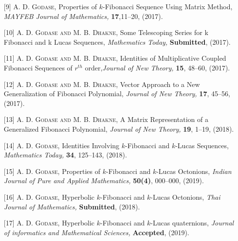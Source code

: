 \begin{footnotesize}
\begin{itemize}
\item[{[9]}]\textsc{A. D. Godase}, Properties of $k$-Fibonacci Sequence Using Matrix Method, {\it MAYFEB Journal of Mathematics,} {\bf 17},11--20, (2017).

\item[{[10]}] \textsc{A. D. Godase and M. B. Dhakne,} Some Telescoping Series for k Fibonacci and k Lucas Sequences, {\it Mathematics Today,} {\bf Submitted}, (2017).

\item[{[11]}] \textsc{A. D. Godase and M. B. Dhakne,} {Identities of Multiplicative Coupled Fibonacci Sequences of $r^{th}$ order,}{\it Journal of New Theory,} {\bf 15}, 48--60, (2017).

\item[{[12]}]\textsc{A. D. Godase and M. B. Dhakne}, Vector Approach to a New Generalization of Fibonacci Polynomial,  {\it Journal of New Theory,} {\bf 17}, 45--56,(2017).

\item[{[13]}] \textsc{A. D. Godase and M. B. Dhakne,} A Matrix Representation of a Generalized Fibonacci Polynomial, {\it Journal of New Theory,} {\bf 19}, 1--19, (2018).
 
 \item[{[14]}] \textsc{A. D. Godase,} Identities Involving $k$-Fibonacci and $k$-Lucas Sequences, {\it Mathematics Today,} {\bf 34}, 125--143, (2018). 
 
 \item[{[15]}] \textsc{A. D. Godase,} Properties of $k$-Fibonacci and $k$-Lucas Octonions, {\it Indian Journal of Pure and Applied Mathematics,} {\bf 50(4)}, 000--000, (2019).
  
\item[{[16]}] \textsc{A. D. Godase,} Hyperbolic $k$-Fibonacci and $k$-Lucas Octonions, {\it Thai Journal of  Mathematics,} {\textbf{Submitted}},  (2018). 
 
\item[{[17]}] \textsc{A. D. Godase,} Hyperbolic $k$-Fibonacci and $k$-Lucas quaternions, {\it Journal of   informatics and Mathematical Sciences,} {\textbf{Accepted}},  (2019). 
  \end{itemize}
  \end{footnotesize}